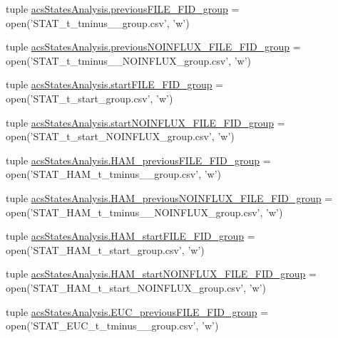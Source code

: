 \begin{DoxyCompactItemize}
\item 
tuple \hyperlink{a00104_a9e72c152be1f5aac24af10b353b16390}{acs\-States\-Analysis.\-previous\-F\-I\-L\-E\-\_\-\-F\-I\-D\-\_\-group} = open('S\-T\-A\-T\-\_\-t\-\_\-tminus\-\_\-\_\-group.\-csv', 'w')
\item 
tuple \hyperlink{a00104_a648b56a19ba8992cdb56d307ed22eb41}{acs\-States\-Analysis.\-previous\-N\-O\-I\-N\-F\-L\-U\-X\-\_\-\-F\-I\-L\-E\-\_\-\-F\-I\-D\-\_\-group} = open('S\-T\-A\-T\-\_\-t\-\_\-tminus\-\_\-\_\-\-N\-O\-I\-N\-F\-L\-U\-X\-\_\-group.\-csv', 'w')
\item 
tuple \hyperlink{a00104_addede16e21598cc53c446efa66bd20d9}{acs\-States\-Analysis.\-start\-F\-I\-L\-E\-\_\-\-F\-I\-D\-\_\-group} = open('S\-T\-A\-T\-\_\-t\-\_\-start\-\_\-group.\-csv', 'w')
\item 
tuple \hyperlink{a00104_a14eebfeaac72a017ee76d69b55033042}{acs\-States\-Analysis.\-start\-N\-O\-I\-N\-F\-L\-U\-X\-\_\-\-F\-I\-L\-E\-\_\-\-F\-I\-D\-\_\-group} = open('S\-T\-A\-T\-\_\-t\-\_\-start\-\_\-\-N\-O\-I\-N\-F\-L\-U\-X\-\_\-group.\-csv', 'w')
\item 
tuple \hyperlink{a00104_aa72272e636b1eafe39ed3367145433f2}{acs\-States\-Analysis.\-H\-A\-M\-\_\-previous\-F\-I\-L\-E\-\_\-\-F\-I\-D\-\_\-group} = open('S\-T\-A\-T\-\_\-\-H\-A\-M\-\_\-t\-\_\-tminus\-\_\-\_\-group.\-csv', 'w')
\item 
tuple \hyperlink{a00104_a092676cc95ddff57aac2aa077ce22d52}{acs\-States\-Analysis.\-H\-A\-M\-\_\-previous\-N\-O\-I\-N\-F\-L\-U\-X\-\_\-\-F\-I\-L\-E\-\_\-\-F\-I\-D\-\_\-group} = open('S\-T\-A\-T\-\_\-\-H\-A\-M\-\_\-t\-\_\-tminus\-\_\-\_\-\-N\-O\-I\-N\-F\-L\-U\-X\-\_\-group.\-csv', 'w')
\item 
tuple \hyperlink{a00104_ab74ecb2bab6a84c44274814862f2e96c}{acs\-States\-Analysis.\-H\-A\-M\-\_\-start\-F\-I\-L\-E\-\_\-\-F\-I\-D\-\_\-group} = open('S\-T\-A\-T\-\_\-\-H\-A\-M\-\_\-t\-\_\-start\-\_\-group.\-csv', 'w')
\item 
tuple \hyperlink{a00104_a4652c6dad393663e40970d7f6422c1d6}{acs\-States\-Analysis.\-H\-A\-M\-\_\-start\-N\-O\-I\-N\-F\-L\-U\-X\-\_\-\-F\-I\-L\-E\-\_\-\-F\-I\-D\-\_\-group} = open('S\-T\-A\-T\-\_\-\-H\-A\-M\-\_\-t\-\_\-start\-\_\-\-N\-O\-I\-N\-F\-L\-U\-X\-\_\-group.\-csv', 'w')
\item 
tuple \hyperlink{a00104_adf079c2d443f89f00a330a58f99c2095}{acs\-States\-Analysis.\-E\-U\-C\-\_\-previous\-F\-I\-L\-E\-\_\-\-F\-I\-D\-\_\-group} = open('S\-T\-A\-T\-\_\-\-E\-U\-C\-\_\-t\-\_\-tminus\-\_\-\_\-group.\-csv', 'w')
\item 

\end{DoxyCompactItemize}
